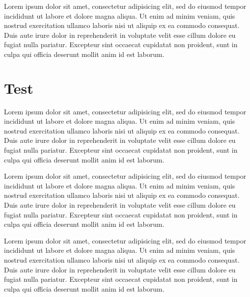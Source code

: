 \documentclass[10pt,a4paper,extrafontsizes,oldfontcommands,oneside]{memoir}
\begin{document}
Lorem ipsum dolor sit amet, consectetur adipisicing elit, sed do eiusmod tempor incididunt ut labore et dolore magna aliqua. Ut enim ad minim veniam, quis nostrud exercitation ullamco laboris nisi ut aliquip ex ea commodo consequat. Duis aute irure dolor in reprehenderit in voluptate velit esse cillum dolore eu fugiat nulla pariatur. Excepteur sint occaecat cupidatat non proident, sunt in culpa qui officia deserunt mollit anim id est laborum.


\clearpage

\begin{hideshorttoc}

\printtoc

\end{hideshorttoc}

\clearpage
{}

\mainmatter

\chapter[Test TOC][Test Header]{Test} %
\label{chap:test}

Lorem ipsum dolor sit amet, consectetur adipisicing elit, sed do eiusmod tempor incididunt ut labore et dolore magna aliqua. Ut enim ad minim veniam, quis nostrud exercitation ullamco laboris nisi ut aliquip ex ea commodo consequat. Duis aute irure dolor in reprehenderit in voluptate velit esse cillum dolore eu fugiat nulla pariatur. Excepteur sint occaecat cupidatat non proident, sunt in culpa qui officia deserunt mollit anim id est laborum.

Lorem ipsum dolor sit amet, consectetur adipisicing elit, sed do eiusmod tempor incididunt ut labore et dolore magna aliqua. Ut enim ad minim veniam, quis nostrud exercitation ullamco laboris nisi ut aliquip ex ea commodo consequat. Duis aute irure dolor in reprehenderit in voluptate velit esse cillum dolore eu fugiat nulla pariatur. Excepteur sint occaecat cupidatat non proident, sunt in culpa qui officia deserunt mollit anim id est laborum.

Lorem ipsum dolor sit amet, consectetur adipisicing elit, sed do eiusmod tempor incididunt ut labore et dolore magna aliqua. Ut enim ad minim veniam, quis nostrud exercitation ullamco laboris nisi ut aliquip ex ea commodo consequat. Duis aute irure dolor in reprehenderit in voluptate velit esse cillum dolore eu fugiat nulla pariatur. Excepteur sint occaecat cupidatat non proident, sunt in culpa qui officia deserunt mollit anim id est laborum.
\end{document}
